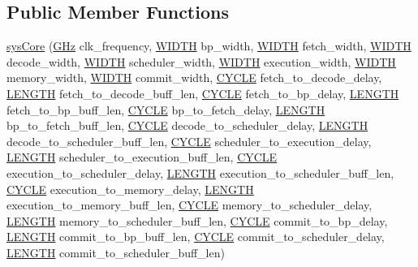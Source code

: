 \subsection*{Public Member Functions}
\begin{DoxyCompactItemize}
\item 
\hyperlink{classsysCore_a1372d54e87258b1725df6c2b61aaa6fe}{sysCore} (\hyperlink{global_2global_8h_a32516e1b668a88eb546e9b6ee2e3345d}{GHz} clk\_\-frequency, \hyperlink{global_2global_8h_a6fa2e24b8a418fa215e183264cbea3aa}{WIDTH} bp\_\-width, \hyperlink{global_2global_8h_a6fa2e24b8a418fa215e183264cbea3aa}{WIDTH} fetch\_\-width, \hyperlink{global_2global_8h_a6fa2e24b8a418fa215e183264cbea3aa}{WIDTH} decode\_\-width, \hyperlink{global_2global_8h_a6fa2e24b8a418fa215e183264cbea3aa}{WIDTH} scheduler\_\-width, \hyperlink{global_2global_8h_a6fa2e24b8a418fa215e183264cbea3aa}{WIDTH} execution\_\-width, \hyperlink{global_2global_8h_a6fa2e24b8a418fa215e183264cbea3aa}{WIDTH} memory\_\-width, \hyperlink{global_2global_8h_a6fa2e24b8a418fa215e183264cbea3aa}{WIDTH} commit\_\-width, \hyperlink{global_2global_8h_a7e19a550ec11d1ed921deb20c22efb5b}{CYCLE} fetch\_\-to\_\-decode\_\-delay, \hyperlink{global_2global_8h_ad7ec63c69447a2b630929c8e0197860d}{LENGTH} fetch\_\-to\_\-decode\_\-buff\_\-len, \hyperlink{global_2global_8h_a7e19a550ec11d1ed921deb20c22efb5b}{CYCLE} fetch\_\-to\_\-bp\_\-delay, \hyperlink{global_2global_8h_ad7ec63c69447a2b630929c8e0197860d}{LENGTH} fetch\_\-to\_\-bp\_\-buff\_\-len, \hyperlink{global_2global_8h_a7e19a550ec11d1ed921deb20c22efb5b}{CYCLE} bp\_\-to\_\-fetch\_\-delay, \hyperlink{global_2global_8h_ad7ec63c69447a2b630929c8e0197860d}{LENGTH} bp\_\-to\_\-fetch\_\-buff\_\-len, \hyperlink{global_2global_8h_a7e19a550ec11d1ed921deb20c22efb5b}{CYCLE} decode\_\-to\_\-scheduler\_\-delay, \hyperlink{global_2global_8h_ad7ec63c69447a2b630929c8e0197860d}{LENGTH} decode\_\-to\_\-scheduler\_\-buff\_\-len, \hyperlink{global_2global_8h_a7e19a550ec11d1ed921deb20c22efb5b}{CYCLE} scheduler\_\-to\_\-execution\_\-delay, \hyperlink{global_2global_8h_ad7ec63c69447a2b630929c8e0197860d}{LENGTH} scheduler\_\-to\_\-execution\_\-buff\_\-len, \hyperlink{global_2global_8h_a7e19a550ec11d1ed921deb20c22efb5b}{CYCLE} execution\_\-to\_\-scheduler\_\-delay, \hyperlink{global_2global_8h_ad7ec63c69447a2b630929c8e0197860d}{LENGTH} execution\_\-to\_\-scheduler\_\-buff\_\-len, \hyperlink{global_2global_8h_a7e19a550ec11d1ed921deb20c22efb5b}{CYCLE} execution\_\-to\_\-memory\_\-delay, \hyperlink{global_2global_8h_ad7ec63c69447a2b630929c8e0197860d}{LENGTH} execution\_\-to\_\-memory\_\-buff\_\-len, \hyperlink{global_2global_8h_a7e19a550ec11d1ed921deb20c22efb5b}{CYCLE} memory\_\-to\_\-scheduler\_\-delay, \hyperlink{global_2global_8h_ad7ec63c69447a2b630929c8e0197860d}{LENGTH} memory\_\-to\_\-scheduler\_\-buff\_\-len, \hyperlink{global_2global_8h_a7e19a550ec11d1ed921deb20c22efb5b}{CYCLE} commit\_\-to\_\-bp\_\-delay, \hyperlink{global_2global_8h_ad7ec63c69447a2b630929c8e0197860d}{LENGTH} commit\_\-to\_\-bp\_\-buff\_\-len, \hyperlink{global_2global_8h_a7e19a550ec11d1ed921deb20c22efb5b}{CYCLE} commit\_\-to\_\-scheduler\_\-delay, \hyperlink{global_2global_8h_ad7ec63c69447a2b630929c8e0197860d}{LENGTH} commit\_\-to\_\-scheduler\_\-buff\_\-len)

\end{DoxyCompactItemize}
